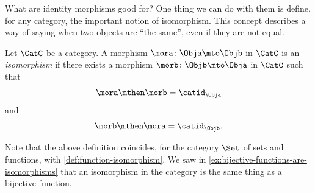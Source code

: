 What are identity morphisms good for? One thing we can do with them is define, for any category, the important notion of isomorphism.
This concept describes a way of saying when two objects are ``the same'', even if they are not equal.

\begin{definition}\label{def:isomorphism}
    Let $\CatC$ be a category.
    A morphism $\mora \colon \Obja \mto \Objb$ in $\CatC$ is an \emph{isomorphism} if there exists a morphism $\morb \colon \Objb \mto \Obja$ in $\CatC$ such that
    \begin{equation}
        \mora \mthen \morb = \catid_\Obja
    \end{equation}
    and
    \begin{equation}
        \morb \mthen \mora = \catid_\Objb.
    \end{equation}
\end{definition}

\begin{remark}
    Note that the above definition coincides, for the category $\Set$ of sets and functions, with \cref{def:function-isomorphism}.
    We saw in \cref{ex:bijective-functions-are-isomorphisms} that an isomorphism in the category \Set is the same thing as a bijective function.
\end{remark}



